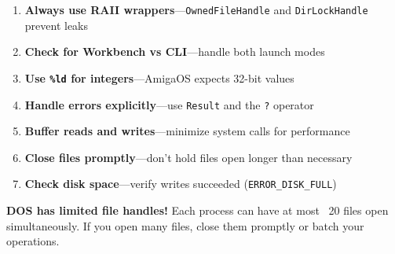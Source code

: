\begin{enumerate}
    \item \textbf{Always use RAII wrappers}---\texttt{OwnedFileHandle} and \texttt{DirLockHandle} prevent leaks
    \item \textbf{Check for Workbench vs CLI}---handle both launch modes
    \item \textbf{Use \texttt{\%ld} for integers}---AmigaOS expects 32-bit values
    \item \textbf{Handle errors explicitly}---use \texttt{Result} and the \texttt{?} operator
    \item \textbf{Buffer reads and writes}---minimize system calls for performance
    \item \textbf{Close files promptly}---don't hold files open longer than necessary
    \item \textbf{Check disk space}---verify writes succeeded (\texttt{ERROR\_DISK\_FULL})
\end{enumerate}

\begin{warningbox}
\textbf{DOS has limited file handles!} Each process can have at most ~20 files open simultaneously. If you open many files, close them promptly or batch your operations.
\end{warningbox}

